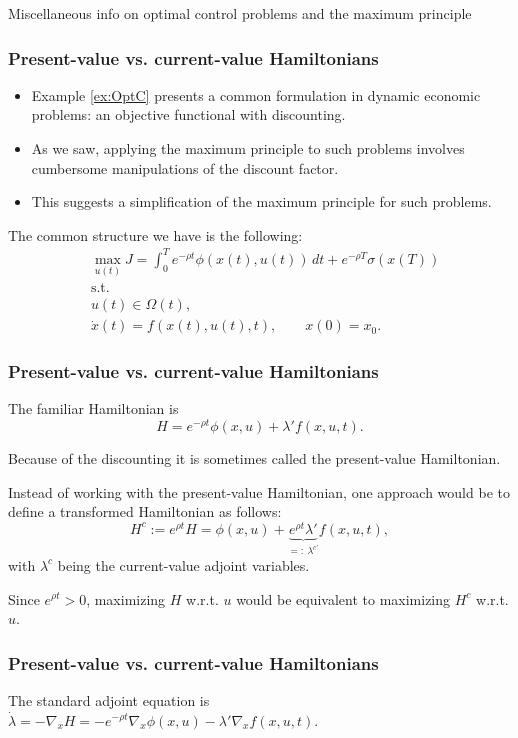 \documentclass[10pt]{beamer}
\theoremstyle{definition}
\begin{document}
\begin{section}{Miscellaneous info on optimal control problems and the maximum principle}\label{sec:misc}

\begin{frame}[fragile]
\frametitle{Present-value vs. current-value Hamiltonians}
\begin{itemize}
\item Example \ref{ex:OptC} presents a common formulation in dynamic economic problems: an objective functional with discounting.
\item As we saw, applying the maximum principle to such problems involves cumbersome manipulations of the discount factor.
\item This suggests a simplification of the maximum principle for such problems.
\end{itemize}\bigskip

The common structure we have is the following:
\begin{equation*}
\begin{split}
& \max_{u(t)} J = \int_{0}^{T}e^{-\rho t}\phi(x(t),u(t))\,dt + e^{-\rho T}\sigma (x(T)) \\
&\text{s.t.}\\
& u(t)\in \Omega(t) ,\\
& \dot{x}(t)=f(x(t),u(t),t),\qquad x(0)=x_0.
\end{split}
\end{equation*}
\end{frame}

\begin{frame}[fragile]
\frametitle{Present-value vs. current-value Hamiltonians}
The familiar Hamiltonian is \[  H = e^{-\rho t}\phi(x,u) + \lambda' f(x,u,t) . \]

Because of the discounting it is sometimes called the present-value Hamiltonian.\bigskip

Instead of working with the present-value Hamiltonian, one approach would be to define a transformed Hamiltonian as follows:
\[ H^c := e^{\rho t}H = \phi (x,u)+ \underbrace{e^{\rho t} \lambda'}_{=:~ \lambda^{c \prime}} f(x,u,t), \] with $ \lambda^c $ being the current-value adjoint variables.

Since $ e^{\rho t} > 0 $, maximizing $ H $ w.r.t. $ u $ would be equivalent to maximizing $ H^c $ w.r.t. $ u $.
\end{frame}

\begin{frame}[fragile]
\frametitle{Present-value vs. current-value Hamiltonians}
The standard adjoint equation is $ \dot{\lambda} = -\nabla_x H =  -e^{-\rho t}\nabla_x\phi(x,u) - \lambda'  \nabla_x f(x,u,t) $.\bigskip


\end{frame}
\end{section}
\end{document}
